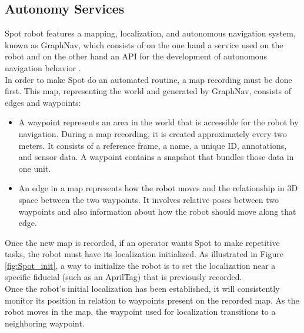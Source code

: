 \subsection{Autonomy Services}
Spot robot features a mapping, localization, and autonomous navigation system, known as GraphNav, which consists of on the one hand a service used on the robot and on the other hand an API for the development of autonomous navigation behavior \cite{SpotAutonomy}.\\ 

In order to make Spot do an automated routine, a map recording must be done first. This map, representing the world and generated by GraphNav, consists of edges and waypoints: 

\begin{itemize}
    \item A waypoint represents an area in the world that is accessible for the robot by navigation. During a map recording, it is created approximately every two meters. It consists of a reference frame, a name, a unique ID, annotations, and sensor data. A waypoint contains a snapshot that bundles those data in one unit.

    \item An edge in a map represents how the robot moves and the relationship in 3D space between the two waypoints. It involves relative poses between two waypoints and also information about how the robot should move along that edge.

\end{itemize}

Once the new map is recorded, if an operator wants Spot to make repetitive tasks, the robot must have its localization initialized. As illustrated in Figure \ref{fig:Spot_init}, a way to initialize the robot is to set the localization near a specific fiducial (such as an AprilTag) that is previously recorded.\\

Once the robot's initial localization has been established, it will consistently monitor its position in relation to waypoints present on the recorded map. As the robot moves in the map, the waypoint used for localization transitions to a neighboring waypoint. \\

